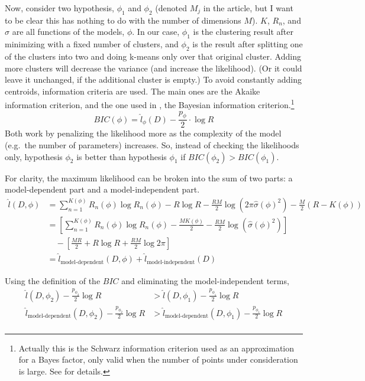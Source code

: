 \documentclass[letterpaper]{article}
\begin{document}
Now, consider two hypothesis, $\phi_1$ and $\phi_2$ (denoted $M_j$ in
the article, but I want to be clear this has nothing to do with the
number of dimensions $M$).  $K$, $R_n$, and $\sigma$ are all functions
of the models, $\phi$.  In our case, $\phi_1$ is the clustering result
after minimizing with a fixed number of clusters, and $\phi_2$ is the
result after splitting one of the clusters into two and doing k-means
only over that original cluster.  Adding more clusters will decrease
the variance (and increase the likelihood).  (Or it could leave it
unchanged, if the additional cluster is empty.)  To avoid constantly
adding centroids, information criteria are used.  The main ones are
the Akaike information criterion, and the one used in
\cite{Pelleg2000}, the Bayesian information
criterion.\footnote{Actually this is the Schwarz information criterion
  used as an approximation for a Bayes factor, only valid when the
  number of points under consideration is large.  See \cite{Kass1995}
  for details.}
\begin{equation}
  \label{eq:22}
  BIC(\phi) = \hat{l}_\phi(D) - \frac{p_{\phi}}{2} \cdot \log R
\end{equation}
Both work by penalizing the likelihood more as the complexity of the
model (e.g.\ the number of parameters) increases.  So, instead of
checking the likelihoods only, hypothesis $\phi_2$ is better than
hypothesis $\phi_1$ if $BIC(\phi_2) > BIC(\phi_1)$.

For clarity, the maximum likelihood can be broken into the sum of two
parts: a model-dependent part and a model-independent part.
\begin{align}
  \label{eq:16}
  \hat{l}(D, \phi) &= \sum_{n=1}^{K(\phi)} R_n(\phi) \log R_n(\phi) - R \log R - \frac{RM}{2} \log \left(2 \pi \hat{\sigma}(\phi)^2 \right)
                   - \frac{M}{2} \left( R - K(\phi) \right) \\
                   &= \left[ \sum_{n=1}^{K(\phi)} R_n(\phi) \log R_n(\phi) - \frac{M K(\phi)}{2} - \frac{RM}{2} \log \left( \hat{\sigma}(\phi)^2 \right) \right] \nonumber \\
                   & \quad - \left[ \frac{M R}{2} + R \log R + \frac{RM}{2} \log 2 \pi \right] \\
                   &= \hat{l}_{\text{model-dependent}}(D, \phi) + \hat{l}_{\text{model-independent}}(D)
\end{align}

Using the definition of the $BIC$ and eliminating the model-independent terms,
\begin{align}
  \hat{l}(D, \phi_2) - \frac{p_{\phi_2}}{2} \log R &> \hat{l}(D, \phi_1) - \frac{p_{\phi_1}}{2} \log R \nonumber \\
  \label{eq:17}
  \hat{l}_{\text{model-dependent}}(D, \phi_2) - \frac{p_{\phi_2}}{2} \log R &> \hat{l}_{\text{model-dependent}}(D, \phi_1) - \frac{p_{\phi_1}}{2} \log R \nonumber \\
\end{align}
\end{document}
